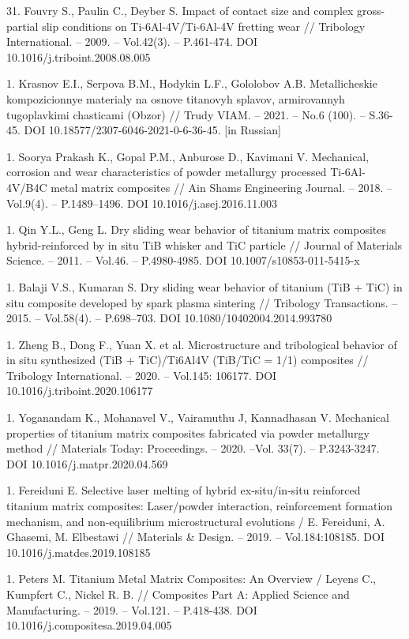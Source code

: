31. Fouvry S., Paulin C., Deyber S. Impact of contact size and complex
gross-partial slip conditions on Ti-6Al-4V/Ti-6Al-4V fretting wear //
Tribology International. -- 2009. -- Vol.42(3). -- P.461-474. DOI
10.1016/j.triboint.2008.08.005

1. Krasnov E.I., Serpova B.M., Hodykin L.F., Gololobov A.B.
Metallicheskie kompozicionnye materialy na osnove titanovyh splavov,
armirovannyh tugoplavkimi chasticami (Obzor) // Trudy VIAM. -- 2021.
-- No.6 (100). -- S.36-45. DOI 10.18577/2307-6046-2021-0-6-36-45.
{[}in Russian{]}

1. Soorya Prakash K., Gopal P.M., Anburose D., Kavimani V. Mechanical,
corrosion and wear characteristics of powder metallurgy processed
Ti-6Al-4V/B4C metal matrix composites // Ain Shams Engineering
Journal. -- 2018. -- Vol.9(4). -- P.1489--1496. DOI
10.1016/j.asej.2016.11.003

1. Qin Y.L., Geng L. Dry sliding wear behavior of titanium matrix
composites hybrid-reinforced by in situ TiB whisker and TiC particle
// Journal of Materials Science. -- 2011. -- Vol.46. -- P.4980-4985.
DOI 10.1007/s10853-011-5415-x

1. Balaji V.S., Kumaran S. Dry sliding wear behavior of titanium (TiB +
TiC) in situ composite developed by spark plasma sintering //
Tribology Transactions. -- 2015. -- Vol.58(4). -- P.698--703. DOI
10.1080/10402004.2014.993780

1. Zheng B., Dong F., Yuan X. et al. Microstructure and tribological
behavior of in situ synthesized (TiB + TiC)/Ti6Al4V (TiB/TiC = 1/1)
composites // Tribology International. -- 2020. -- Vol.145: 106177.
DOI 10.1016/j.triboint.2020.106177

1. Yoganandam K., Mohanavel V., Vairamuthu J, Kannadhasan V. Mechanical
properties of titanium matrix composites fabricated via powder
metallurgy method // Materials Today: Proceedings. -- 2020. --Vol.
33(7). -- P.3243-3247. DOI 10.1016/j.matpr.2020.04.569

1. Fereiduni E. Selective laser melting of hybrid ex-situ/in-situ
reinforced titanium matrix composites: Laser/powder interaction,
reinforcement formation mechanism, and non-equilibrium microstructural
evolutions / E. Fereiduni, A. Ghasemi, M. Elbestawi // Materials \&
Design. -- 2019. -- Vol.184:108185. DOI 10.1016/j.matdes.2019.108185

1. Peters M. Titanium Metal Matrix Composites: An Overview / Leyens C.,
Kumpfert C., Nickel R. B. // Composites Part A: Applied Science and
Manufacturing. -- 2019. -- Vol.121. -- P.418-438. DOI
10.1016/j.compositesa.2019.04.005

